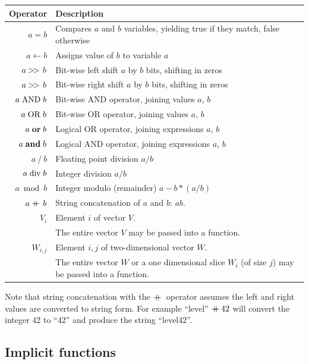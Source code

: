 \documentclass[a4paper]{article}
\begin{document}
\begin{tabular}{rl}
\hline
\textbf{Operator} & \textbf{Description}\\
\hline
$a = b$       & Compares $a$ and $b$ variables, yielding true if they match, false otherwise\\
$a \gets b$   & Assigns value of $b$ to variable $a$\\
$a \mathbin{>\mkern-3mu>\,} b$ & Bit-wise left shift $a$ by $b$ bits, shifting in zeros \\
$a \mathbin{>\mkern-3mu>\,} b$ & Bit-wise right shift $a$ by $b$ bits, shifting in zeros \\
$a \bitand b$ & Bit-wise AND operator, joining values $a$, $b$\\
$a \bitor b$  & Bit-wise OR operator, joining values $a$, $b$\\
$a \logor b$  & Logical OR operator, joining expressions $a$, $b$\\
$a \logand b$ & Logical AND operator, joining expressions $a$, $b$\\
$a\ /\ b$     & Floating point division $a/b$\\
$a \bdiv b$   & Integer division $a/b$\\
$a \bmod b$   & Integer modulo (remainder) $a - b*(a/b)$\\
$a \mathbin{+\mkern-10mu+\,} b$ & String concatenation of $a$ and $b$: $ab$.\\
$V_i$         & Element $i$ of vector $V$.\\
              & The entire vector $V$ may be passed into a function.\\
$W_{i,j}$      & Element $i,j$ of two-dimensional vector $W$.\\
              & The entire vector $W$ or a one dimensional slice $W_i$ (of size $j$) may be passed into a function.\\
\hline
\end{tabular}

Note that string concatenation with the $\mathbin{+\mkern-10mu+\,}$ operator
assumes the left and right values are converted to string form.  For
example ``level'' $\mathbin{+\mkern-10mu+\,} 42$ will convert the integer 42 to ``42''
and produce the string ``level42''.

\subsection{Implicit functions}
\end{document}
